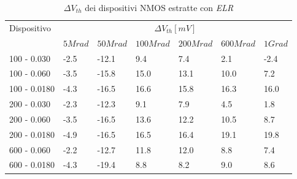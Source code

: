 \begin{table}[H]
  \renewcommand{\arraystretch}{1.3}
  \begin{tabular}{m{2.1cm}  m{1.1cm} m{1.3cm} m{1.5cm} m{1.5cm} m{1.5cm} m{1cm}}
    \toprule
    \multirow{2}{*}{Dispositivo} & \multicolumn{6}{c}{$\Delta V_{th} [mV] $}                                                          \\
    \cmidrule{2-7}
                                 & $5Mrad$                                   & $50Mrad$ & $100Mrad$ & $200Mrad$ & $600Mrad$ & $1Grad$ \\
    \midrule
    100 - 0.030                     & -2.5                                      & -12.1    & 9.4       & 7.4       & 2.1       & -2.4        \\
    \hline
    100 - 0.060                     & -3.5                                      & -15.8    & 15.0      & 13.1      & 10.0      & 7.2        \\
    \hline
    100 - 0.0180                    & -4.3                                      & -16.5    & 16.6      & 15.8      & 16.3      & 16.0        \\
    \hline
    200 - 0.030                     & -2.3                                      & -12.3    & 9.1       & 7.9       & 4.5       & 1.8        \\
    \hline
    200 - 0.060                     & -3.5                                      & -16.5    & 13.6      & 12.2      & 10.5      & 8.7        \\
    \hline
    200 - 0.0180                    & -4.9                                      & -16.5    & 16.5      & 16.4      & 19.1      & 19.8        \\
    \hline
    600 - 0.060                     & -2.2                                      & -12.7    & 11.8      & 12.0      & 8.8       &  7.4       \\
    \hline
    600 - 0.0180                    & -4.3                                      & -19.4    & 8.8       & 8.2       & 9.0       & 8.6        \\
    \bottomrule
  \end{tabular}
  \caption{$\Delta V_{th}$ dei dispositivi NMOS estratte con \emph{ELR}}
  \label{tab:deltaVthELRN}
\end{table}

